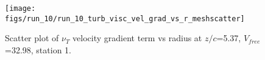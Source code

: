 \begin{figure}[H]
\centering
\texttt{[image: figs/run\_10/run\_10\_turb\_visc\_vel\_grad\_vs\_r\_meshscatter]}
\caption{Scatter plot of $\nu_T$ velocity gradient term vs radius at $z/c$=5.37, $V_{free}$=32.98, station 1.}
\label{fig:run_10_turb_visc_vel_grad_vs_r_meshscatter}
\end{figure}


